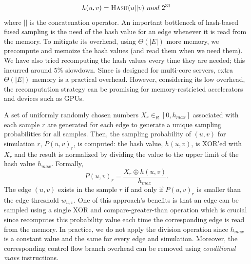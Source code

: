 \documentclass[final,5p,times,twocolumn]{elsarticle}
\newcommand\acro{{\sc{HyperFuseR\xspace}\xspace}\xspace}
\newcommand\fixme[1]{#1}
\begin{document}
\begin{equation}
    \label{eq:hash}
    h(u,v) = \mbox{{\sc Hash}}(u||v)~mod~2^{31}  
\end{equation} %
where $||$ is the concatenation operator. 
An  important bottleneck of hash-based fused sampling is the need of the hash value for an edge whenever it is read from the memory. To mitigate its overhead, using $\Theta(|E|)$ more memory, we precompute and memoize the hash values (and read them when we need them). We have also tried recomputing the hash values every time they are needed; this incurred around $5\%$ slowdown. Since {\acro} is designed for multi-core servers, extra $\Theta(|E|)$ memory is a practical overhead. However, considering its low overhead, the recomputation strategy can be promising for memory-restricted accelerators and devices such as GPUs.


A set of uniformly \fixme{ randomly chosen numbers $X_r \in_R [0, h_{max}]$ } associated with each sample $r$ are generated for each edge to generate a unique sampling probabilities for all samples. Then, the sampling probability of $(u, v)$ for simulation $r$, $P(u, v)_r$, is computed: the hash value, $h(u,v)$, is XOR'ed with  $X_r$ and the result is normalized by dividing the value to the upper limit of the hash value $h_{max}$. Formally,
\begin{equation}
    \label{eq:hash_prob}
    P(u,v)_r = \frac{X_r \oplus h(u,v)}{h_{max}}.
\end{equation}
The edge $(u,v)$ exists \fixme{in the sample $r$ if and only if  ${P}(u,v)_r$ is smaller than the edge threshold $w_{u,v}$.} One of this approach's benefits is that an edge can be sampled using \fixme{a single XOR and compare-greater-than operation} which is crucial since \acro{} recomputes this probability value each time the corresponding edge is read from the memory. In practice, we do not apply the division operation since $h_{max}$ is a constant value and the same for every edge and simulation. Moreover, the corresponding control flow branch overhead can be \fixme{removed} using {\em conditional move} \fixme{instructions}. 
\end{document}

